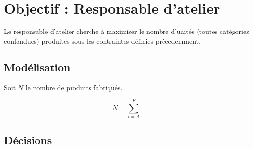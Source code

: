 \newpage
\section{Objectif : Responsable d'atelier}
Le responsable d'atelier cherche à maximiser le nombre d'unités (toutes
catégories confondues) produites sous les contraintes définies précedemment.

\subsection{Modélisation}
Soit $N$ le nombre de produits fabriqués.

\begin{equation}
	N = \sum_{i = A}^{F}
\end{equation} 

\subsection{Décisions}